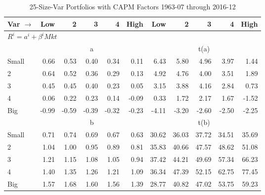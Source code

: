
\begin{table}[!ht]
\centering
\caption{25-Size-Var Portfolios with CAPM Factors 1963-07 through 2016-12}
\begin{tabular}{lrrrrrrrrrr}
  \toprule
    Var $\rightarrow$ & Low & 2 & 3 & 4 & High & Low & 2 & 3 & 4 & High \\ 
  \midrule
  \multicolumn{11}{l}{$R^i=a^i+\beta^iMkt$} \\

  
    
      & \multicolumn{5}{c}{a} & \multicolumn{5}{c}{t(a)}
    
    \\
      \cmidrule(r){2-6} \cmidrule(r){7-11}

    Small   & 0.66  & 0.53  & 0.40  & 0.34  & 0.11  & 6.43  & 5.80  & 4.96  & 3.97  & 1.44  \\
         2  & 0.64  & 0.52  & 0.36  & 0.29  & 0.13  & 4.92  & 4.76  & 4.00  & 3.51  & 1.89  \\
         3  & 0.45  & 0.45  & 0.40  & 0.23  & 0.05  & 3.15  & 3.88  & 4.16  & 2.84  & 0.73  \\
         4  & 0.06  & 0.22  & 0.23  & 0.14  & -0.09  & 0.33  & 1.72  & 2.17  & 1.67  & -1.52  \\
    Big     & -0.99  & -0.59  & -0.39  & -0.32  & -0.23  & -4.11  & -3.20  & -2.60  & -2.50  & -2.25  \\

  
    
      & \multicolumn{5}{c}{b} & \multicolumn{5}{c}{t(b)}
    
    \\
      \cmidrule(r){2-6} \cmidrule(r){7-11}

    Small   & 0.71  & 0.74  & 0.69  & 0.67  & 0.63  & 30.62  & 36.03  & 37.72  & 34.51  & 35.69  \\
         2  & 1.04  & 1.00  & 0.95  & 0.89  & 0.81  & 35.83  & 40.66  & 47.57  & 48.62  & 51.08  \\
         3  & 1.21  & 1.15  & 1.08  & 1.05  & 0.94  & 37.42  & 44.21  & 49.69  & 57.34  & 66.23  \\
         4  & 1.40  & 1.35  & 1.26  & 1.21  & 1.09  & 36.34  & 47.39  & 52.15  & 62.75  & 77.45  \\
    Big     & 1.57  & 1.68  & 1.60  & 1.56  & 1.39  & 28.77  & 40.82  & 47.02  & 53.75  & 59.23  \\

  

  \bottomrule
\end{tabular}
\label{tbl:25_Size_Var_CAPM}
\end{table}